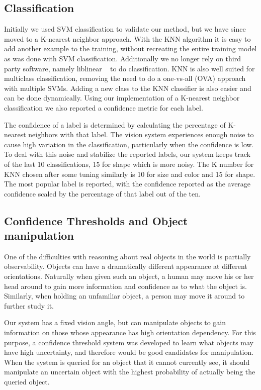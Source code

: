 \documentclass[11pt]{article}
\begin{document}
\subsection{Classification}
Initially we used SVM classification to validate our method, but we have since
moved to a K-nearest neighbor approach.  With the KNN algorithm
it is easy to add another example to the training, without recreating the
entire training model as was done with SVM classification.  Additionally we no
longer rely on third party software, namely liblinear ~\cite{LIBLINEAR} to do
classification. KNN is also well suited for multiclass classification, removing
the need to do a one-vs-all (OVA) approach with multiple SVMs.  Adding a new
class to the KNN classifier is also easier and can be done dynamically. Using our
implementation of a K-nearest neighbor
classification we also reported a confidence metric for each label.

The confidence of a label is determined by calculating the percentage of K-nearest neighbors with that label.  The vision system experiences enough noise
to cause high variation in the classification, particularly when the
confidence is low.  To deal with this noise and stabilize the reported labels,
our system keeps track of the last 10 classifications, 15 for shape which is more noisy.  The K number for KNN chosen after some tuning similarly is 10 for size and color and 15 for shape.  The most popular label
is reported, with the confidence reported as the average confidence scaled by
the percentage of that label out of the ten.


\subsection{Confidence Thresholds and Object manipulation}
One of the difficulties with reasoning about real objects in the world is partially observability. Objects can have a dramatically different appearance at
different orientations. Naturally when given such an object, a human may move
his or her head around to gain more information and confidence as to what the object
is.  Similarly, when holding an unfamiliar object, a person may move it around
to further study it.

Our system has a fixed vision angle, but can
manipulate objects to gain information on those whose appearance has high
orientation dependency. For this purpose, a confidence threshold system was
developed to learn what objects may have high uncertainty, and therefore would
be good candidates for manipulation. When the system is queried for an object
that it cannot currently see, it should manipulate an uncertain object with the
highest probability of actually being the queried object.
\end{document}
